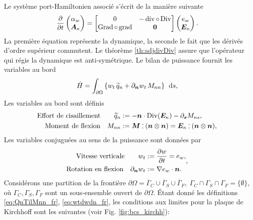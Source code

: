 Le système port-Hamiltonien associé s'écrit de la manière suivante
\begin{equation}
\diffp{}{t}
\begin{pmatrix}
\alpha_w \\
\bm{A}_{\kappa} \\
\end{pmatrix} = 
\begin{bmatrix}
0  &  - \div \circ \Div \\
\Grad \circ \grad & \bm{0} \\
\end{bmatrix}
\begin{pmatrix}
e_w \\
\bm{E}_{\kappa} \\
\end{pmatrix}.
\end{equation}
La première équation représente la dynamique, la seconde le fait que les dérivés d'ordre supérieur commutent. Le théorème \ref{th:adjdivDiv} assure que l'opérateur qui régis la dynamique est anti-symétrique. Le bilan de puissance fournit les variables au bord
\begin{equation}
\dot{H} = \int_{\partial \Omega} \left\{ w_t \, \widetilde{q}_n + \partial_{\bm{n}}{w_t} \, M_{nn}\right\} \, \d{s}, 
\end{equation} 
Les variables au bord sont définis 
\begin{subequations}
	\label{eq:QnTilMnn_fr}
	\begin{align}
	\text{Effort de cisaillement}  \qquad \widetilde{q}_{n} &:= - \bm{n} \cdot \mathrm{Div}(\bm{E}_{\kappa}) - \partial_{\bm{s}}{M_{ns}}, \\
	\text{Moment de flexion} \quad M_{nn} &:=  \bm{M} \cddot (\bm{n}\otimes{\bm{n}}) = \bm{E}_{\kappa} \cddot (\bm{n}\otimes{\bm{n}}),
	\end{align}
\end{subequations}
Les variables conjuguées au sens de la puissance sont données par
\begin{subequations}
	\label{eq:wtdwdn_fr}
	\begin{align}
	\text{Vitesse verticale}  \qquad w_t &:= \diffp{w}{t} = e_w, \\
	\text{Rotation en flexion} \quad 
	\partial_{\bm{n}}{w_t} &:= \nabla{e_w} \cdot \bm{n}.
	\end{align},
\end{subequations}
Considérons une partition de la frontière $ \partial \Omega = \overline{\Gamma}_{C} \cup \overline{\Gamma}_{S} \cup \overline {\Gamma}_{F}, \; {\Gamma}_{C} \cap {\Gamma}_{S} \cap {\Gamma}_{F} = \{\emptyset\} $, où $ {\Gamma}_{C}, {\Gamma}_{S}, {\Gamma}_{F} $ sont un sous-ensemble ouvert de $\partial \Omega $. Étant donné les définitions \eqref{eq:QnTilMnn_fr}, \eqref{eq:wtdwdn_fr}, les conditions aux limites pour la plaque de Kirchhoff \cite{gustafsson2018} sont les suivantes (voir Fig. \ref{fig:bcs_kirchh}):
